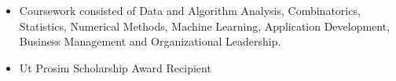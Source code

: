 \documentclass[10pt,a4paper,ragged2e,withhyper]{altacv}
\begin{document}
\begin{paracol}{2}
\divider\smallskip

 \break
{}



\medskip


\begin{itemize}
\small\item Coursework consisted of Data and Algorithm Analysis, Combinatorics, Statistics, Numerical Methods, Machine Learning, Application \break Development, Business Management and Organizational Leadership.
\small\item Ut Prosim Scholarship Award Recipient
\end{itemize}
\large
\large{} \break
\large{} \break
\large{} \break

\end{paracol}
\end{document}
